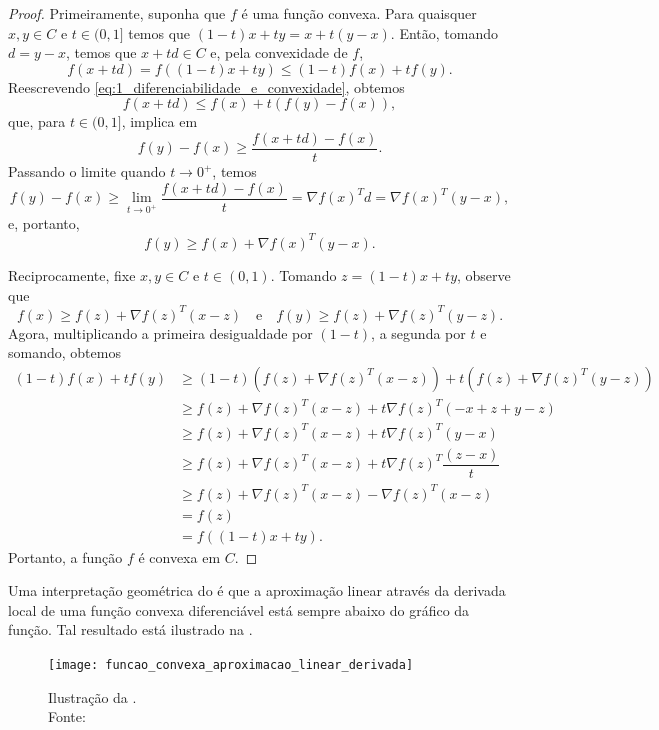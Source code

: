 \documentclass[12pt,a4paper]{scrartcl}
\theoremstyle{definition}%
\begin{document}
\begin{proof}
Primeiramente, suponha que $f$ é uma função convexa. Para quaisquer $x,y \in C$ e $t \in (0,1]$ temos que $(1-t)x + ty = x + t(y-x)$. Então, tomando $d = y-x$, temos que $x + td \in C$ e, pela convexidade de $f$,
\[ \label{eq:1_diferenciabilidade_e_convexidade}
f(x+td) = f((1-t)x + ty) \leq (1-t)f(x) + tf(y).
\]
Reescrevendo \eqref{eq:1_diferenciabilidade_e_convexidade}, obtemos
\[
f(x+td) \leq f(x) + t(f(y)-f(x)),
\]
que, para $t\in (0,1]$, implica em 
\[
f(y)-f(x) \geq \dfrac{f(x+td)-f(x)}{t} .
\]
Passando o limite quando $t \rightarrow 0^{+}$, temos
\[
f(y)-f(x) \geq \displaystyle\lim_{t \rightarrow 0^{+}} \dfrac{f(x+td)-f(x)}{t} = \nabla f(x)^{T} d = \nabla f(x)^{T} (y-x) ,
\]
e, portanto,
\[
f(y) \geq f(x) + \nabla f(x)^{T} (y-x) .
\]

Reciprocamente, fixe $x, y \in C$ e $t \in (0,1)$. Tomando $z = (1-t)x + ty$, observe que 
\[
f(x) \geq f(z) + \nabla f(z)^{T}(x-z) \quad \text{e} \quad f(y) \geq f(z) + \nabla f(z)^{T}(y-z) .
\]
Agora, multiplicando a primeira desigualdade por $(1-t)$, a segunda por $t$ e somando, obtemos
\begin{align}
(1-t)f(x) + tf(y) & \geq (1-t)(f(z) + \nabla f(z)^{T}(x-z)) + t(f(z) + \nabla f(z)^{T}(y-z)) \\
& \geq f(z) + \nabla f(z)^{T}(x-z) + t\nabla f(z)^{T}(-x+z+y-z) \\
& \geq f(z) + \nabla f(z)^{T}(x-z) + t\nabla f(z)^{T}(y-x) \\
& \geq f(z) + \nabla f(z)^{T}(x-z) + t\nabla f(z)^{T} \dfrac{(z-x)}{t} \\
& \geq f(z) + \nabla f(z)^{T}(x-z) - \nabla f(z)^{T}(x-z) \\
& = f(z) \\
& = f((1-t)x + ty) .
\end{align}
Portanto, a função $f$ é convexa em $C$.
\end{proof}

Uma interpretação geométrica do  é que a aproximação linear através da derivada local de uma função convexa diferenciável está sempre abaixo do gráfico da função. Tal resultado está ilustrado na . 
\begin{figure}[!ht] 
	\centering
	\texttt{[image: funcao\_convexa\_aproximacao\_linear\_derivada]}
	\caption{Ilustração da . \label{fig:funcao_convexa_aproximacao_linear_derivada} \\ Fonte: \textcite{luenberger2008linear}}
\end{figure}
\end{document}
